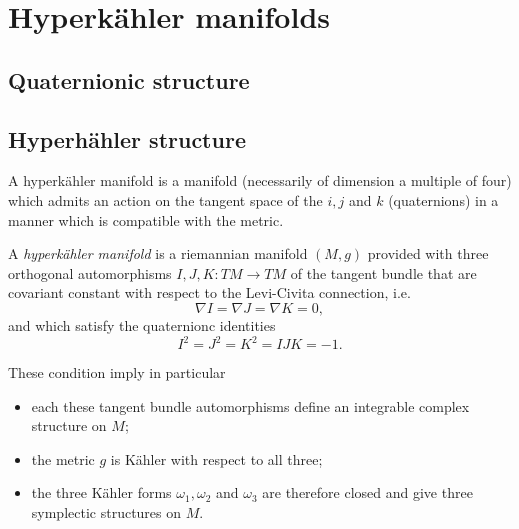 \documentclass{worksheetclass}
\begin{document}
\section{Hyperkähler manifolds}

    \subsection{Quaternionic structure}

    \subsection{Hyperhähler structure}

        A hyperkähler manifold is a manifold (necessarily of dimension a multiple of four) which admits an action on the tangent space of the $i,j$ and $k$ (quaternions) in a manner which is compatible with the metric.
        \begin{defn}
            A \emph{hyperkähler manifold} is a riemannian manifold $(M,g)$ provided with three orthogonal automorphisms $I,J,K:TM\to TM$ of the tangent bundle that are covariant constant with respect to the Levi-Civita connection, i.e.
            \begin{equation*}
                \nabla I=\nabla J=\nabla K = 0,
            \end{equation*}
            and which satisfy the quaternionc identities
            \begin{equation*}
                I^2=J^2=K^2=IJK = -1.
            \end{equation*}
        \end{defn}
        These condition imply in particular
        \begin{itemize}
            \item each these tangent bundle automorphisms define an integrable complex structure on $M$;
            \item the metric $g$ is Kähler with respect to all three;
            \item the three Kähler forms $\omega_1,\omega_2$ and $\omega_3$ are therefore closed and give three symplectic structures on $M$.
        \end{itemize}
\end{document}
